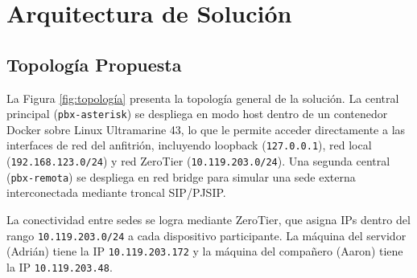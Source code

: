 \documentclass[12pt,a4paper]{article}
\begin{document}
\section{Arquitectura de Solución}

\subsection{Topología Propuesta}

La Figura \ref{fig:topología} presenta la topología general de la solución. La central principal (\texttt{pbx-asterisk}) se despliega en modo host dentro de un contenedor Docker sobre Linux Ultramarine 43, lo que le permite acceder directamente a las interfaces de red del anfitrión, incluyendo loopback (\texttt{127.0.0.1}), red local (\texttt{192.168.123.0/24}) y red ZeroTier (\texttt{10.119.203.0/24}). Una segunda central (\texttt{pbx-remota}) se despliega en red bridge para simular una sede externa interconectada mediante troncal SIP/PJSIP.

La conectividad entre sedes se logra mediante ZeroTier, que asigna IPs dentro del rango \texttt{10.119.203.0/24} a cada dispositivo participante. La máquina del servidor (Adrián) tiene la IP \texttt{10.119.203.172} y la máquina del compañero (Aaron) tiene la IP \texttt{10.119.203.48}.
\end{document}
